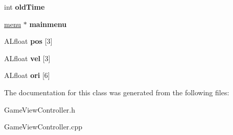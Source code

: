 \begin{DoxyCompactItemize}
\item 
\hypertarget{class_game_view_controller_a39a60f61eea22078c9b5371971b7a0c0}{int {\bfseries old\-Time}}\label{class_game_view_controller_a39a60f61eea22078c9b5371971b7a0c0}

\item 
\hypertarget{class_game_view_controller_aab32bff4f1a3b3c12279ce6c29eaef86}{\hyperlink{classmenu}{menu} $\ast$ {\bfseries mainmenu}}\label{class_game_view_controller_aab32bff4f1a3b3c12279ce6c29eaef86}

\item 
\hypertarget{class_game_view_controller_a3441dd8397265ff7c9fc81a6445603b2}{A\-Lfloat {\bfseries pos} \mbox{[}3\mbox{]}}\label{class_game_view_controller_a3441dd8397265ff7c9fc81a6445603b2}

\item 
\hypertarget{class_game_view_controller_a722c13809b23d45f591651ae4581d593}{A\-Lfloat {\bfseries vel} \mbox{[}3\mbox{]}}\label{class_game_view_controller_a722c13809b23d45f591651ae4581d593}

\item 
\hypertarget{class_game_view_controller_ad8a34e8ebc038a6dac34fb77eb0ace30}{A\-Lfloat {\bfseries ori} \mbox{[}6\mbox{]}}\label{class_game_view_controller_ad8a34e8ebc038a6dac34fb77eb0ace30}

\end{DoxyCompactItemize}


The documentation for this class was generated from the following files\-:\begin{DoxyCompactItemize}
\item 
Game\-View\-Controller.\-h\item 
Game\-View\-Controller.\-cpp\end{DoxyCompactItemize}
